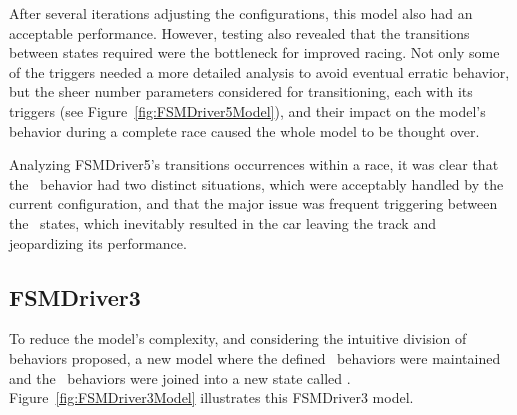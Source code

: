After several iterations adjusting the configurations, this model also had an acceptable performance. However, testing also revealed that the transitions between states required were the bottleneck for improved racing. Not only some of the triggers needed a more detailed analysis to avoid eventual erratic behavior, but the sheer number parameters considered for transitioning, each with its triggers (see Figure~\ref{fig:FSMDriver5Model}), and their impact on the model's behavior during a complete race caused the whole model to be thought over.

Analyzing FSMDriver5's transitions occurrences within a race, it was clear that the \recovery~behavior had two distinct situations, which were acceptably handled by the current configuration, and that the major issue was frequent triggering between the \racing~states, which inevitably resulted in the car leaving the track and jeopardizing its performance.






\subsection{FSMDriver3}%
To reduce the model's complexity, and considering the intuitive division of behaviors proposed, a new model where the defined \recovery~behaviors were maintained and the \racing~behaviors were joined into a new state called \IT. Figure~\ref{fig:FSMDriver3Model} illustrates this FSMDriver3 model.

